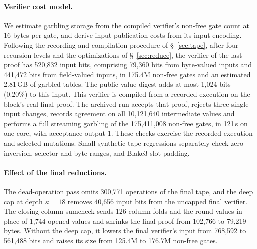\documentclass[11pt]{article}
\begin{document}
\paragraph{Verifier cost model.} We estimate garbling storage from the
compiled verifier's non-free gate count at 16 bytes per gate, and derive
input-publication costs from its input encoding. Following the
recording and compilation procedure of \S~\ref{sec:tape}, after four recursion
levels and the optimizations of \S~\ref{sec:reduce}, the verifier
of the last proof has 520{,}832 input bits, comprising 79{,}360 bits from
byte-valued inputs and 441{,}472 bits from field-valued inputs, in 175.4M non-free gates
and an estimated 2.81\,GB of garbled tables. The public-value digest adds at most 1{,}024 bits (0.20\%) to this input. This verifier is compiled from a
recorded execution on the block's real final proof. The archived run accepts that proof,
rejects three single-input changes, records agreement on all 10{,}121{,}640
intermediate values and performs a full streaming garbling of the
175{,}411{,}008 non-free gates, in 121\,s on one core, with acceptance output 1.
These checks exercise the
recorded execution and selected mutations. Small synthetic-tape regressions
separately check zero inversion, selector and byte ranges, and Blake3 slot
padding.

\paragraph{Effect of the final reductions.} The dead-operation pass omits
300{,}771 operations of the final tape, and the deep cap at depth $\kappa=18$
removes 40{,}656 input bits from the uncapped final verifier. The closing
column sumcheck sends 126 column folds and the round values in place of 1{,}744
opened values and shrinks the final proof from 102{,}766 to 79{,}219 bytes.
Without the deep cap, it lowers the final verifier's input from 768{,}592 to
561{,}488 bits and raises its size from 125.4M to 176.7M non-free gates.
\end{document}
